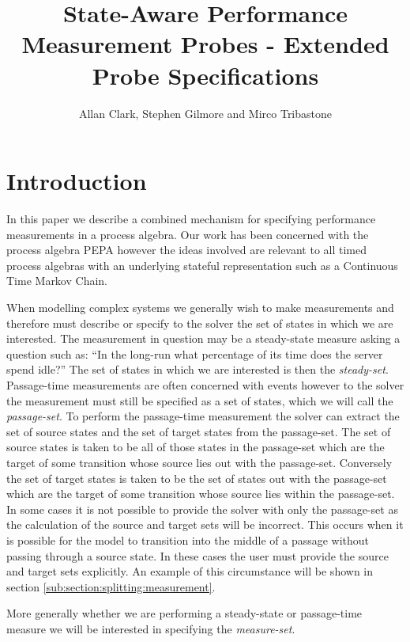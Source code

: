 \documentclass[times, 10pt,twocolumn]{article}
\title{State-Aware Performance Measurement Probes - Extended Probe Specifications}
\author{
Allan Clark, Stephen Gilmore and Mirco Tribastone
}
\newcommand{\pepa}{\textrm{PEPA}}
\begin{document}
\maketitle


\section{Introduction}

In this paper we describe a combined mechanism for specifying
performance measurements in a process algebra.
Our work has been concerned with the process algebra \pepa\cite{pepa}
however the ideas involved are relevant to all timed process algebras
with an underlying stateful representation such as a
Continuous Time Markov Chain.

When modelling complex systems we generally wish to make measurements 
and therefore must describe or specify to the solver the set of states
in which we are interested.
The measurement in question may be a steady-state measure asking a question
such as: ``In the long-run what percentage of its time does the server spend idle?''
The set of states in which we are interested is then the \emph{steady-set}.
Passage-time measurements are often concerned with events however to the solver
the measurement must still be specified as a set of states, which we will call
the \emph{passage-set}.
To perform the passage-time measurement the solver can extract
the set of source states and the set of target states from the passage-set.
The set of source states is taken to be all of those states in the passage-set
which are the target of some transition whose source lies out with the
passage-set. Conversely the set of target states is taken to be the set of states
out with the passage-set which are the target of some transition whose source
lies within the passage-set.
In some cases it is not possible to provide the solver with only the passage-set
as the calculation of the source and target sets will be incorrect.
This occurs when it is possible for the model to transition into the middle
of a passage without passing through a source state.
In these cases the user must provide the source and target sets explicitly.
An example of this circumstance will be shown in section
\ref{sub:section:splitting:measurement}.

More generally whether we are performing a steady-state or passage-time measure
we will be interested in specifying the \emph{measure-set}.
\end{document}
